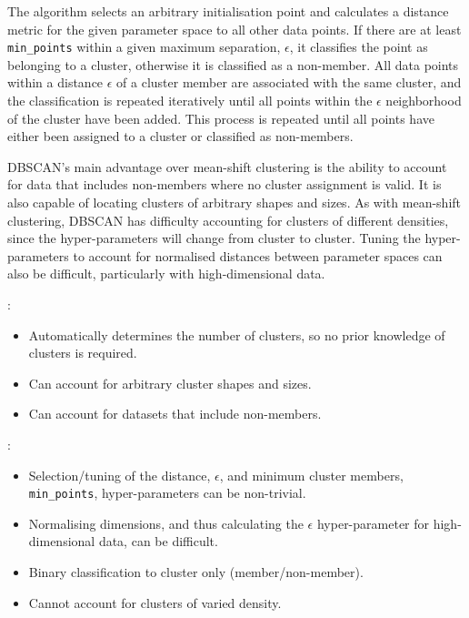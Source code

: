 The algorithm selects an arbitrary initialisation point and calculates a distance metric for the given parameter space to all other data points. If there are at least \texttt{min\_points} within a given maximum separation, $\epsilon$, it classifies the point as belonging to a cluster, otherwise it is classified as a non-member. All data points within a distance $\epsilon$ of a cluster member are associated with the same cluster, and the classification is repeated iteratively until all points within the $\epsilon$ neighborhood of the cluster have been added. This process is repeated until all points have either been assigned to a cluster or classified as non-members.

DBSCAN's main advantage over mean-shift clustering is the ability to account for data that includes non-members where no cluster assignment is valid. It is also capable of locating clusters of arbitrary shapes and sizes. As with mean-shift clustering, DBSCAN has difficulty accounting for clusters of different densities, since the hyper-parameters will change from cluster to cluster. Tuning the hyper-parameters to account for normalised distances between parameter spaces can also be difficult, particularly with high-dimensional data.

\vspace{10pt}


: 
\begin{itemize}
    \item Automatically determines the number of clusters, so no prior knowledge of clusters is required.
    \item Can account for arbitrary cluster shapes and sizes.
    \item Can account for datasets that include non-members.
\end{itemize} 

: 
\begin{itemize}
    \item Selection/tuning of the distance, $\epsilon$, and minimum cluster members, \texttt{min\_points}, hyper-parameters can be non-trivial.
    \item Normalising dimensions, and thus calculating the $\epsilon$ hyper-parameter for high-dimensional data, can be difficult.
    \item Binary classification to cluster only (member/non-member).
    \item Cannot account for clusters of varied density.
\end{itemize}

